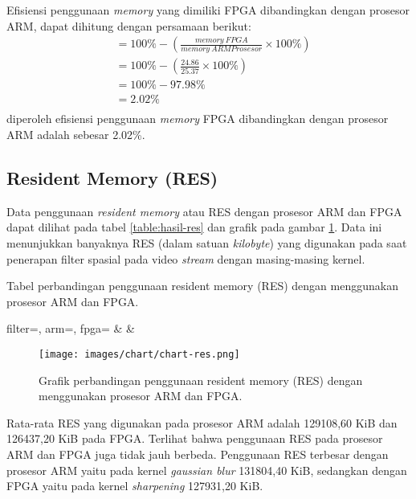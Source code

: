 Efisiensi penggunaan \textit{memory} yang dimiliki FPGA dibandingkan dengan prosesor ARM, dapat dihitung dengan persamaan berikut:
\begin{equation*}
    \begin{split}
& = 100\% - \left( \frac{memory\ FPGA}{memory\ ARM Prosesor} \times 100\% \right) \\
& = 100\% - \left( \frac{24.86}{25.37} \times 100\% \right) \\
& = 100\% - 97.98\% \\
& = 2.02\% \\
    \end{split}
\end{equation*}
diperoleh efisiensi penggunaan \textit{memory} FPGA dibandingkan dengan prosesor ARM adalah sebesar 2.02\%.


\subsection{Resident Memory (RES)}
Data penggunaan \textit{resident memory} atau RES dengan prosesor ARM dan FPGA dapat dilihat pada tabel \ref{table:hasil-res} dan grafik pada gambar \ref{fig:chart-res}. Data ini menunjukkan banyaknya RES (dalam satuan \textit{kilobyte}) yang digunakan pada saat penerapan filter spasial pada video \textit{stream} dengan masing-masing kernel.

\begin{atable}
    \caption{Tabel perbandingan penggunaan resident memory (RES) dengan menggunakan prosesor ARM dan FPGA.}
    \label{table:hasil-res}
        {
            filter=\filter, 
            arm=\arm, 
            fpga=\fpga}
        {
            \filter & 
            \arm & 
            \fpga }
\end{atable}
\begin{figure}[H]
    \texttt{[image: images/chart/chart-res.png]}
    \caption{Grafik perbandingan penggunaan resident memory (RES) dengan menggunakan prosesor ARM dan FPGA.}
    \label{fig:chart-res}
\end{figure}
Rata-rata RES yang digunakan pada prosesor ARM adalah 129108,60 KiB dan 126437,20 KiB pada FPGA. Terlihat bahwa penggunaan RES pada prosesor ARM dan FPGA juga tidak jauh berbeda. Penggunaan RES terbesar dengan prosesor ARM yaitu pada kernel \textit{gaussian blur} 131804,40 KiB, sedangkan dengan FPGA yaitu pada kernel \textit{sharpening} 127931,20 KiB.

